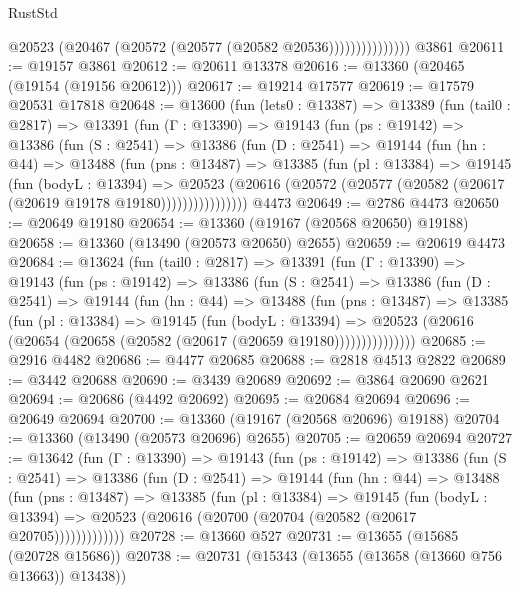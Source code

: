 \begin{lexlean}{RustStd}
\begin{coremodule}
                        @20523 (@20467 (@20572 (@20577 (@20582 @20536)))))))))))))))
    @3861
@20611 := @19157 @3861
@20612 := @20611 @13378
@20616 := @13360 (@20465 (@19154 (@19156 @20612)))
@20617 := @19214 @17577
@20619 := @17579 @20531 @17818
@20648 := @13600
    (fun (lets0 : @13387) =>
    @13389
      (fun (tail0 : @2817) =>
      @13391
        (fun (Γ : @13390) =>
        @19143
          (fun (ps : @19142) =>
          @13386
            (fun (S : @2541) =>
            @13386
              (fun (D : @2541) =>
              @19144
                (fun (hn : @44) =>
                @13488
                  (fun (pns : @13487) =>
                  @13385
                    (fun (pl : @13384) =>
                    @19145
                      (fun (bodyL : @13394) =>
                      @20523
                        (@20616
                          (@20572 (@20577 (@20582 (@20617 (@20619 @19178 @19180))))))))))))))))
    @4473
@20649 := @2786 @4473
@20650 := @20649 @19180
@20654 := @13360 (@19167 (@20568 @20650) @19188)
@20658 := @13360 (@13490 (@20573 @20650) @2655)
@20659 := @20619 @4473
@20684 := @13624
    (fun (tail0 : @2817) =>
    @13391
      (fun (Γ : @13390) =>
      @19143
        (fun (ps : @19142) =>
        @13386
          (fun (S : @2541) =>
          @13386
            (fun (D : @2541) =>
            @19144
              (fun (hn : @44) =>
              @13488
                (fun (pns : @13487) =>
                @13385
                  (fun (pl : @13384) =>
                  @19145
                    (fun (bodyL : @13394) =>
                    @20523 (@20616 (@20654 (@20658 (@20582 (@20617 (@20659 @19180)))))))))))))))
@20685 := @2916 @4482
@20686 := @4477 @20685
@20688 := @2818 @4513 @2822
@20689 := @3442 @20688
@20690 := @3439 @20689
@20692 := @3864 @20690 @2621
@20694 := @20686 (@4492 @20692)
@20695 := @20684 @20694
@20696 := @20649 @20694
@20700 := @13360 (@19167 (@20568 @20696) @19188)
@20704 := @13360 (@13490 (@20573 @20696) @2655)
@20705 := @20659 @20694
@20727 := @13642
    (fun (Γ : @13390) =>
    @19143
      (fun (ps : @19142) =>
      @13386
        (fun (S : @2541) =>
        @13386
          (fun (D : @2541) =>
          @19144
            (fun (hn : @44) =>
            @13488
              (fun (pns : @13487) =>
              @13385
                (fun (pl : @13384) =>
                @19145
                  (fun (bodyL : @13394) =>
                  @20523 (@20616 (@20700 (@20704 (@20582 (@20617 @20705)))))))))))))
@20728 := @13660 @527
@20731 := @13655 (@15685 (@20728 @15686))
@20738 := @20731 (@15343 (@13655 (@13658 (@13660 @756 @13663)) @13438))

\end{coremodule}
\end{lexlean}
